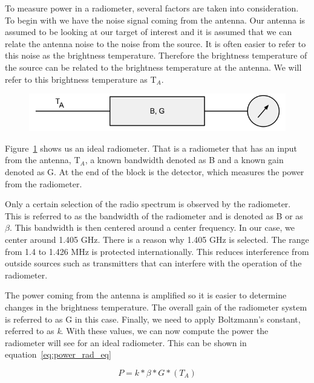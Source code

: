 To measure power in a radiometer, several factors are taken into consideration.  To begin with we have the noise signal coming from the antenna.  Our antenna is assumed to be looking at our target of interest and it is assumed that we can relate the antenna noise to the noise from the source.  It is often easier to refer to this noise as the brightness temperature.  Therefore the brightness temperature of the source can be related to the brightness temperature at the antenna.  We will refer to this brightness temperature as T$_{A}$.  

{\begin{figure}[h!tb] 
\centering
\includegraphics[width=\textwidth]{Images/simple_rad.png}
\label{simplerad}
\end{figure}
}

Figure~\ref{simplerad} shows us an ideal radiometer.  That is a radiometer that has an input from the antenna, T$_{A}$, a known bandwidth denoted as B and a known gain denoted as G.  At the end of the block is the detector, which measures the power from the radiometer.

Only a certain selection of the radio spectrum is observed by the radiometer.  This is referred to as the bandwidth of the radiometer and is denoted as B or as $\beta$.  This bandwidth is then centered around a center frequency.  In our case, we center around 1.405 GHz.  There is a reason why 1.405 GHz is selected.  The range from 1.4 to 1.426 MHz is protected internationally.  This reduces interference from outside sources such as transmitters that can interfere with the operation of the radiometer.  

The power coming from the antenna is amplified so it is easier to determine changes in the brightness temperature.  The overall gain of the radiometer system is referred to as G in this case.  Finally, we need to apply Boltzmann's constant, referred to as \textit{k}.  With these values, we can now compute the power the radiometer will see for an ideal radiometer.  This can be shown in equation~\ref{eq:power_rad_eq}

\begin{equation} \label{eq:power_rad_eq}
P=k*\beta*G*(T_{A})
\end{equation}

